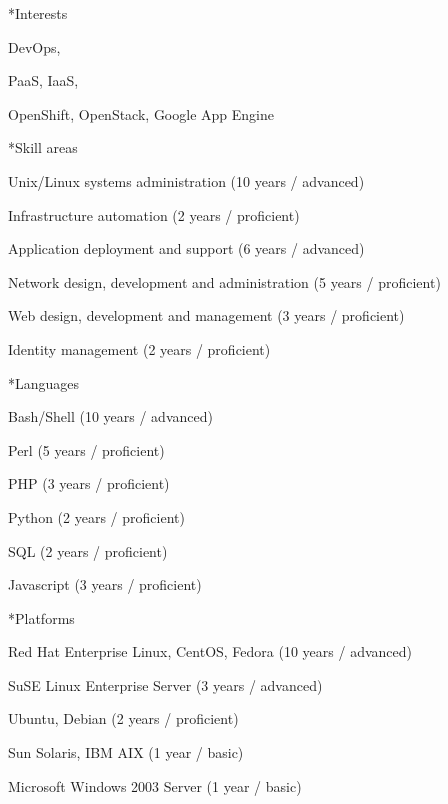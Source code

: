\documentclass[10pt, a4paper, final]{article}
\begin{document}
\begin{minipage}[t]{0.32\linewidth}
\begin{section}
    \vspace{2em}
    \small
    \begin{subsection}*{Interests}
      \begin{inparadesc}
        \item DevOps,
        \item PaaS, IaaS,
        \item OpenShift, OpenStack, Google App Engine
      \end{inparadesc}
    \end{subsection}
    \vspace{1em}
    \begin{subsection}*{Skill areas}
      \begin{compactitem}
        \item Unix/Linux systems administration (10 years / advanced) 
        \item Infrastructure automation (2 years / proficient) 
        \item Application deployment and support (6 years / advanced) 
        \item Network design, development and administration (5 years / proficient) 
        \item Web design, development and management (3 years / proficient) 
        \item Identity management (2 years / proficient) 
      \end{compactitem}
    \end{subsection}
    \vspace{1em}
    \begin{subsection}*{Languages}
      \begin{compactitem}
        \item Bash/Shell (10 years / advanced) 
        \item Perl (5 years / proficient) 
        \item PHP (3 years / proficient) 
        \item Python (2 years / proficient) 
        \item SQL (2 years / proficient) 
        \item Javascript (3 years / proficient) 
      \end{compactitem}
    \end{subsection}
    \vspace{1em}
    \begin{subsection}*{Platforms}
      \begin{compactitem}
        \item Red Hat Enterprise Linux, CentOS, Fedora (10 years / advanced) 
        \item SuSE Linux Enterprise Server (3 years / advanced) 
        \item Ubuntu, Debian (2 years / proficient) 
        \item Sun Solaris, IBM AIX (1 year / basic) 
        \item Microsoft Windows 2003 Server (1 year / basic) 
      \end{compactitem}
    \end{subsection}
  \end{section}
\end{minipage}
\end{document}
